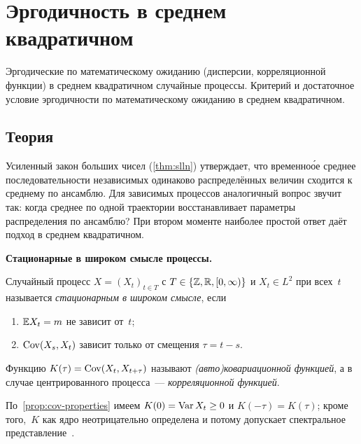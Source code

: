 
\section{Эргодичность в среднем квадратичном}
\label{sec:1.2.08-ergodicity}

\begin{ticket}
Эргодические по математическому ожиданию (дисперсии, корреляционной функции) в среднем квадратичном случайные процессы. Критерий и достаточное условие эргодичности по математическому ожиданию в среднем квадратичном.
\end{ticket}

\subsection*{Теория}

Усиленный закон больших чисел (\cref{thm:slln}) утверждает, что временно\'{о}е среднее последовательности независимых одинаково распределённых величин сходится к среднему по ансамблю. Для зависимых процессов аналогичный вопрос звучит так: когда среднее по одной траектории восстанавливает параметры распределения по ансамблю? При втором моменте наиболее простой ответ даёт подход в среднем квадратичном.

\medskip
\noindent\textbf{Стационарные в широком смысле процессы.}

\begin{definition}
\label{def:wss}
Случайный процесс $X = (X_t)_{t \in T}$ с $T \in \{\mathbb{Z}, \mathbb{R}, [0, \infty)\}$ и $X_t \in L^2$ при всех~$t$ называется \emph{стационарным в широком смысле}, если
\begin{enumerate}[label=(\alph*)]
  \item $\mathbb{E} X_t = m$ не зависит от~$t$;
  \item $\operatorname{Cov}(X_s, X_t)$ зависит только от смещения $\tau = t - s$.
\end{enumerate}
Функцию $K(\tau) = \operatorname{Cov}(X_t, X_{t + \tau})$ называют \emph{(авто)\-ко\-ва\-ри\-а\-ци\-он\-ной функцией}, а в случае центрированного процесса~--- \emph{корреляционной функцией}.
\end{definition}

По~\cref{prop:cov-properties} имеем $K(0) = \operatorname{Var} X_t \geq 0$ и $K(-\tau) = K(\tau)$; кроме того,~$K$ как ядро неотрицательно определена и потому допускает спектральное представление~\cite[гл.~VI, \S~1]{Sevastyanov1982}.

